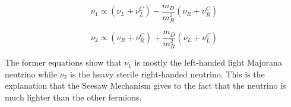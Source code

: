 \begin{equation}
\nu_1 \propto \left( \nu_L + \nu_L^C \right) - \frac{m_D}{m_R^2} \left( \nu_R + \nu_R^C \right)
\end{equation}

\begin{equation}
\nu_2 \propto \left( \nu_R + \nu_R^C \right) + \frac{m_D}{m_R^2} \left( \nu_L + \nu_L^C \right)
\end{equation}

The former equations show that $\nu_1$ is mostly the left-handed light Majorana neutrino while $\nu_2$ is the heavy sterile right-handed neutrino. This is the explanation 
that the Seesaw Mechanism gives to the fact that the neutrino is much lighter than the other fermions. 
 
 
 
 
 
 